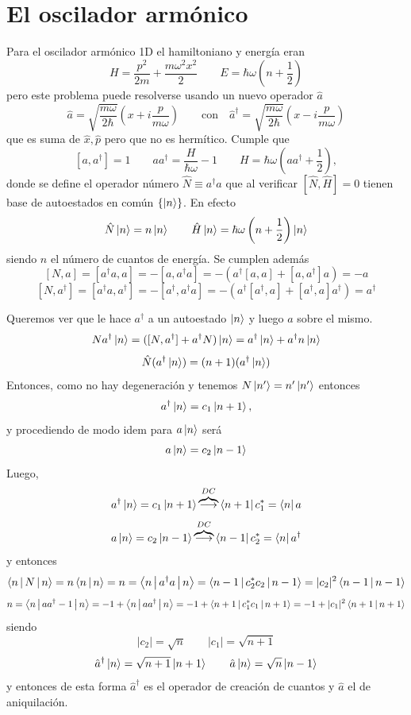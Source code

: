 \documentclass[10pt,oneside]{CBFT_book}
\begin{document}
% 
\chapter{El oscilador armónico}

Para el oscilador armónico 1D  el hamiltoniano y energía eran
\[
	H = \frac{p^2}{2m} + \frac{m\omega^2 x^2}{2} \qquad E = \hbar \omega \left( n + \frac{1}{2} \right)
\]
pero este problema puede resolverse usando un nuevo operador $\hat{a}$
\[
	\hat{a} = \sqrt{\frac{m\omega}{2\hbar}}\left( x + i\frac{p}{m\omega} \right) \qquad \text{con} \quad 
	\hat{a}^\dagger = \sqrt{\frac{m\omega}{2\hbar}}\left( x - i\frac{p}{m\omega} \right)
\]
que es suma de $\hat{x}, \hat{p}$ pero que no es hermítico. Cumple que 
\[
	[a , a^\dagger ] = 1 \qquad a a^\dagger =  \frac{H}{\hbar\omega} -1 \qquad 
	H = \hbar\omega \left( a a^\dagger + \frac{1}{2} \right),
\]
donde se define el operador número $\hat{N}\equiv a^\dagger a$ que al verificar $[\hat{N},\hat{H}]=0$ tienen 
base de 
autoestados en común $\{ \Ket{n} \}$. En efecto 
\[
	\hat{N} \Ket{n} = n\Ket{n} \qquad
	\hat{H} \Ket{n} = \hbar\omega \left( n + \frac{1}{2} \right) \Ket{n}
\]
siendo $n$ el número de cuantos de energía.
Se cumplen además 
\[
	[N,a] = [a^\dagger a,a] = - [ a, a^\dagger a ] = - \left( a^\dagger [a,a] + [a,a^\dagger]a \right) =
	-a
\]
\[
	[N,a^\dagger] = [a^\dagger a, a^\dagger ] = - [a^\dagger , a^\dagger a ] =
	- \left( a^\dagger [a^\dagger,a] + [a^\dagger,a]a^\dagger \right) = a^\dagger
\]

Queremos ver que le  hace $a^\dagger$  a un autoestado $\Ket{n}$ y luego $a$ sobre el mismo.
\[
	N a^\dagger \Ket{n} = ([N, a^\dagger] + a^\dagger N) \Ket{n} =
	a^\dagger \Ket{n} + a^\dagger n \Ket{n} 
\]
\[
	\Hat{N} (a^\dagger\Ket{n}) = (n+1)(a^\dagger\Ket{n})
\]
Entonces, como no hay degeneración y tenemos $N\Ket{n'} = n'\Ket{n'}$ entonces 
\[
	a^\dagger \Ket{n} = c_1 \Ket{n+1},
\]
y procediendo de modo idem para $a\ket{n}$ será
\[
	a \Ket{n} = c_2 \Ket{n-1}
\]
Luego,
\[
	a^\dagger \Ket{n} = c_1 \Ket{n+1} \overbrace{\longrightarrow}^{DC} 
	\Bra{n+1} c_1^* = \Bra{n} a 
\]
\[
	a \Ket{n} = c_2 \Ket{n-1} \overbrace{\longrightarrow}^{DC} \Bra{n-1} c_2^* = \Bra{n} a^\dagger
\]
y entonces 
\[
	\Braket{n|N|n} = n \Braket{n|n} = n =  \Braket{n| a^\dagger a |n} =  \Braket{n-1|c_2^* c_2|n-1} =
	|c_2|^2 \Braket{n-1|n-1}
\]
\[
	n = \Braket{n|aa^\dagger-1|n} = -1 + \Braket{n|aa^\dagger|n} = - 1 + \Braket{n+1|c_1^*c_1|n+1} =
	-1 + |c_1|^2 \Braket{n+1|n+1}
\]
siendo
\[
	|c_2| = \sqrt{n} \qquad |c_1| = \sqrt{n+1} 
\]
\[
	\hat{a}^\dagger \Ket{n} = \sqrt{n+1} \Ket{n+1} \qquad  \hat{a}\Ket{n} = \sqrt{n} \Ket{n-1} 
\]
y entonces de esta forma $\hat{a}^\dagger$ es el operador de creación de cuantos y $\hat{a}$ el de 
aniquilación.
\end{document}
